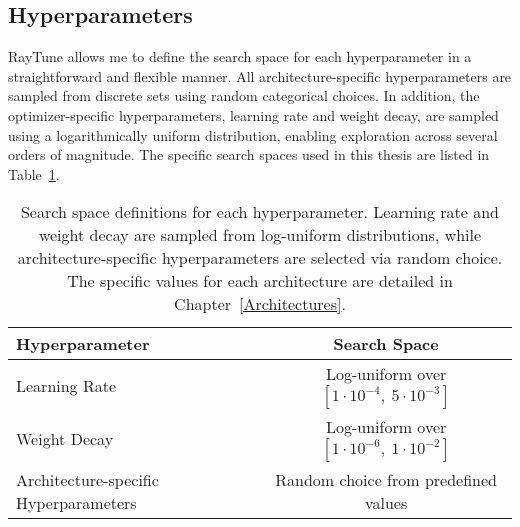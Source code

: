 \subsection{Hyperparameters}

RayTune allows me to define the search space for each hyperparameter in a straightforward and flexible manner. All architecture-specific hyperparameters are sampled from discrete sets using random categorical choices. In addition, the optimizer-specific hyperparameters, learning rate and weight decay, are sampled using a logarithmically uniform distribution, enabling exploration across several orders of magnitude. The specific search spaces used in this thesis are listed in Table~\ref{MethodHyperparams}.

\begin{table}[H]
    \centering
    \begin{tabular}{l|c}
        Hyperparameter & Search Space       \\
        \hline
        Learning Rate      & Log-uniform over $[1 \cdot 10^{-4},\ 5 \cdot 10^{-3}]$ \\
        Weight Decay     & Log-uniform over $[1 \cdot 10^{-6},\ 1 \cdot 10^{-2}]$ \\
        Architecture-specific Hyperparameters      & Random choice from predefined values \\
    \end{tabular}
    \caption{Search space definitions for each hyperparameter. Learning rate and weight decay are sampled from log-uniform distributions, while architecture-specific hyperparameters are selected via random choice. The specific values for each architecture are detailed in Chapter~\ref{Architectures}.}
    \label{MethodHyperparams}
\end{table}